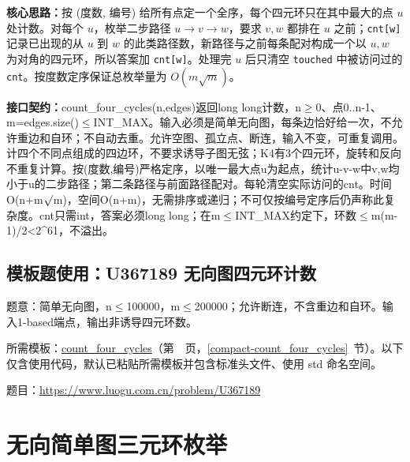 \textbf{核心思路：}\allowbreak 按 (度数, 编号) 给所有点定一个全序，每个四元环只在其中最大的点 $u$ 处计数。对每个 $u$，枚举二步路径 $u\to v\to w$，要求 $v,w$ 都排在 $u$ 之前；\texttt{cnt[w]} 记录已出现的从 $u$ 到 $w$ 的此类路径数，新路径与之前每条配对构成一个以 $u,w$ 为对角的四元环，所以答案加 \texttt{cnt[w]}。处理完 $u$ 后只清空 \texttt{touched} 中被访问过的 \texttt{cnt}。按度数定序保证总枚举量为 $O(m\sqrt m)$。



{\sloppy{}\noindent\textbf{接口契约：}count\_four\_cycles(n,edges)返回long long计数，n$\ge$0、点0..n-1、m=edges.size()$\le$INT\_MAX。输入必须是简单无向图，每条边恰好给一次，不允许重边和自环；不自动去重。允许空图、孤立点、断连，输入不变，可重复调用。计四个不同点组成的四边环，不要求诱导子图无弦；K4有3个四元环，旋转和反向不重复计算。按(度数,编号)严格定序，以唯一最大点u为起点，统计u-v-w中v,w均小于u的二步路径；第二条路径与前面路径配对。每轮清空实际访问的cnt。时间O(n+m$\sqrt{\vphantom x}$m)，空间O(n+m)，无需排序或递归；不可仅按编号定序后仍声称此复杂度。cnt只需int，答案必须long long；在m$\le$INT\_MAX约定下，环数$\le$m(m-1)/2<2\textasciicircum{}61，不溢出。\par}



\Needspace{325pt}

\subsection*{模板题使用：U367189 无向图四元环计数}

\label{usage-example-378}

题意：简单无向图，n$\le$100000，m$\le$200000；允许断连，不含重边和自环。输入1-based端点，输出非诱导四元环数。

所需模板：\hyperref[compact-count_four_cycles]{count\_\allowbreak{}four\_\allowbreak{}cycles}（第~\pageref{compact-count_four_cycles}~页，\ref{compact-count_four_cycles}~节）。以下仅含使用代码，默认已粘贴所需模板并包含标准头文件、使用 std 命名空间。

题目：\url{https://www.luogu.com.cn/problem/U367189}



\Needspace{458pt}

\section{无向简单图三元环枚举}\label{compact-enumerate_triangles}

